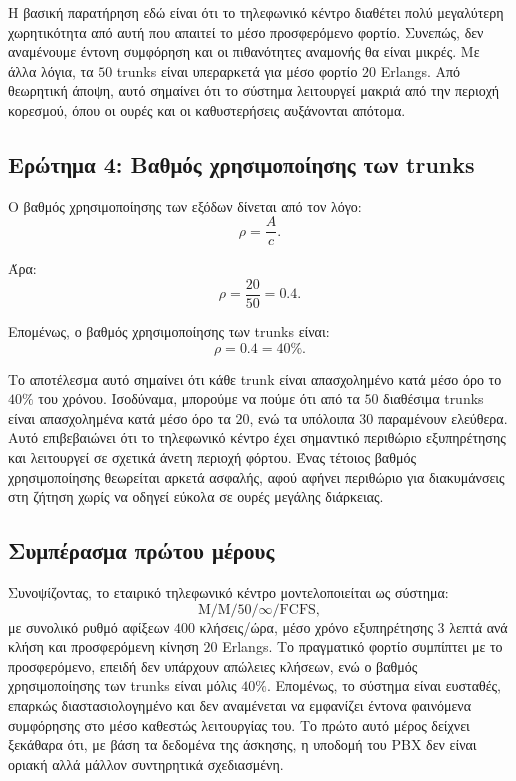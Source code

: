 \documentclass{article}
\begin{document}
Η βασική παρατήρηση εδώ είναι ότι το τηλεφωνικό κέντρο διαθέτει πολύ μεγαλύτερη χωρητικότητα από αυτή που απαιτεί το μέσο προσφερόμενο φορτίο. Συνεπώς, δεν αναμένουμε έντονη συμφόρηση και οι πιθανότητες αναμονής θα είναι μικρές. Με άλλα λόγια, τα $50$ trunks είναι υπεραρκετά για μέσο φορτίο $20$ Erlangs. Από θεωρητική άποψη, αυτό σημαίνει ότι το σύστημα λειτουργεί μακριά από την περιοχή κορεσμού, όπου οι ουρές και οι καθυστερήσεις αυξάνονται απότομα.

\subsection{Ερώτημα 4: Βαθμός χρησιμοποίησης των trunks}

Ο βαθμός χρησιμοποίησης των εξόδων δίνεται από τον λόγο:
\[
\rho = \frac{A}{c}.
\]

Άρα:
\[
\rho = \frac{20}{50} = 0.4.
\]

Επομένως, ο βαθμός χρησιμοποίησης των trunks είναι:
\[
\boxed{\rho = 0.4 = 40\%}.
\]

Το αποτέλεσμα αυτό σημαίνει ότι κάθε trunk είναι απασχολημένο κατά μέσο όρο το $40\%$ του χρόνου. Ισοδύναμα, μπορούμε να πούμε ότι από τα $50$ διαθέσιμα trunks είναι απασχολημένα κατά μέσο όρο τα $20$, ενώ τα υπόλοιπα $30$ παραμένουν ελεύθερα. Αυτό επιβεβαιώνει ότι το τηλεφωνικό κέντρο έχει σημαντικό περιθώριο εξυπηρέτησης και λειτουργεί σε σχετικά άνετη περιοχή φόρτου. Ένας τέτοιος βαθμός χρησιμοποίησης θεωρείται αρκετά ασφαλής, αφού αφήνει περιθώριο για διακυμάνσεις στη ζήτηση χωρίς να οδηγεί εύκολα σε ουρές μεγάλης διάρκειας.

\subsection{Συμπέρασμα πρώτου μέρους}

Συνοψίζοντας, το εταιρικό τηλεφωνικό κέντρο μοντελοποιείται ως σύστημα:
\[
\mathrm{M/M/50/\infty/FCFS},
\]
με συνολικό ρυθμό αφίξεων $400$ κλήσεις/ώρα, μέσο χρόνο εξυπηρέτησης $3$ λεπτά ανά κλήση και προσφερόμενη κίνηση $20$ Erlangs. Το πραγματικό φορτίο συμπίπτει με το προσφερόμενο, επειδή δεν υπάρχουν απώλειες κλήσεων, ενώ ο βαθμός χρησιμοποίησης των trunks είναι μόλις $40\%$. Επομένως, το σύστημα είναι ευσταθές, επαρκώς διαστασιολογημένο και δεν αναμένεται να εμφανίζει έντονα φαινόμενα συμφόρησης στο μέσο καθεστώς λειτουργίας του. Το πρώτο αυτό μέρος δείχνει ξεκάθαρα ότι, με βάση τα δεδομένα της άσκησης, η υποδομή του PBX δεν είναι οριακή αλλά μάλλον συντηρητικά σχεδιασμένη.
\end{document}
